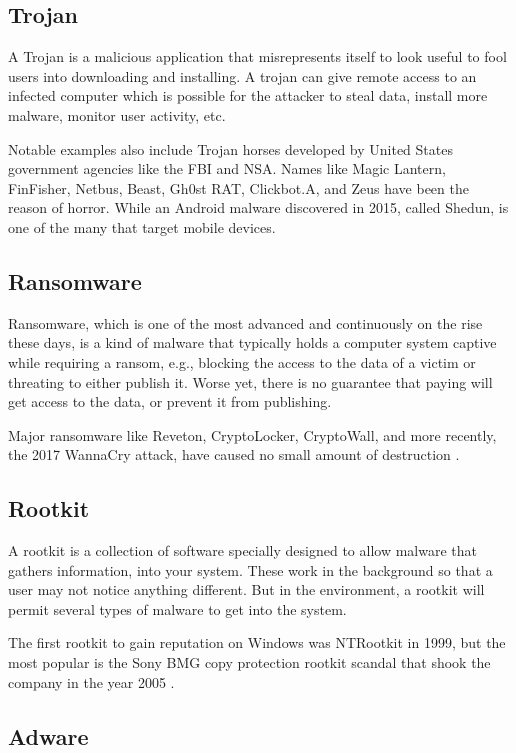 \subsection{Trojan}

A Trojan is a malicious application that misrepresents itself to look useful to fool users into downloading and installing. A trojan can give remote access to an infected computer which is possible for the attacker to steal data, install more malware, monitor user activity, etc.

Notable examples also include Trojan horses developed by United States government agencies like the FBI and NSA. Names like Magic Lantern, FinFisher, Netbus, Beast, Gh0st RAT, Clickbot.A, and Zeus have been the reason of horror. While an Android malware discovered in 2015, called Shedun, is one of the many that target mobile devices.

\subsection{Ransomware}

Ransomware, which is one of the most advanced and continuously on the rise these days, is a kind of malware that typically holds a computer system captive while requiring a ransom, e.g., blocking the access to the data of a victim or threating to either publish it. Worse yet, there is no guarantee that paying will get access to the data, or prevent it from publishing.

Major ransomware like Reveton, CryptoLocker, CryptoWall, and more recently, the 2017 WannaCry attack, have caused no small amount of destruction \cite{chen2017automated}.

\subsection{Rootkit}

A rootkit is a collection of software specially designed to allow malware that gathers information, into your system. These work in the background so that a user may not notice anything different. But in the environment, a rootkit will permit several types of malware to get into the system.

The first rootkit to gain reputation on Windows was NTRootkit in 1999, but the most popular is the Sony BMG copy protection rootkit scandal that shook the company in the year 2005 \cite{bruce2005sony}.

\subsection{Adware}


